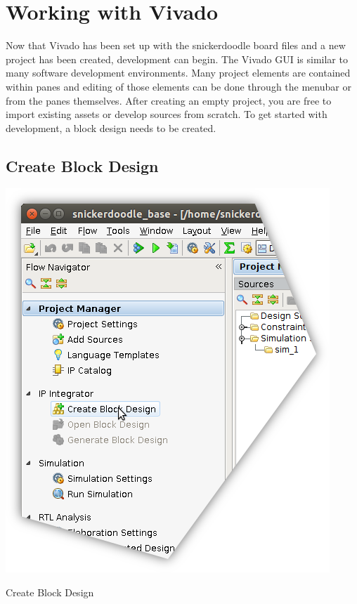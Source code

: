 \section{Working with Vivado}

Now that Vivado has been set up with the snickerdoodle board files and a new project has been created, development can begin. The Vivado GUI is similar to many software development environments. Many project elements are contained within panes and editing of those elements can be done through the menubar or from the panes themselves. After creating an empty project, you are free to import existing assets or develop sources from scratch. To get started with development, a block design needs to be created.


\subsection{Create Block Design}

\begin{marginfigure}
	\centering
	\includegraphics{images/Create_Block_Design.png}
	\caption[Create Block Design]{Create Block Design}
	\label{fig:createblockdesign}
\end{marginfigure}

